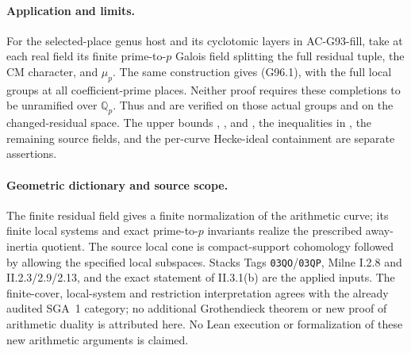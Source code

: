 \paragraph{Application and limits.}
For the selected-place genus host and its cyclotomic layers in
AC-G93-fill, take at each real field its finite prime-to-\(p\)
Galois field splitting the full residual tuple, the CM character,
and \(\mu_p\).  The same construction gives (G96.1), with the
full local groups at all coefficient-prime places.  Neither proof
requires these completions to be unramified over \(\mathbb Q_p\).
Thus  and  are verified on those actual
groups and on the changed-residual space.  The upper bounds
, , and , the inequalities in
, the remaining source  fields, and
the per-curve Hecke-ideal containment are separate assertions.

\paragraph{Geometric dictionary and source scope.}
The finite residual field gives a finite normalization of the
arithmetic curve; its finite local systems and exact prime-to-\(p\)
invariants realize the prescribed away-inertia quotient.  The
source local cone is compact-support cohomology followed by
allowing the specified local subspaces.  Stacks Tags
\texttt{03QO}/\texttt{03QP}, Milne I.2.8 and II.2.3/2.9/2.13,
and the exact statement of II.3.1(b) are the applied inputs.
The finite-cover, local-system and restriction interpretation
agrees with the already audited SGA~1 category; no additional
Grothendieck theorem or new proof of arithmetic duality is
attributed here.  No Lean execution or formalization of these
new arithmetic arguments is claimed.
